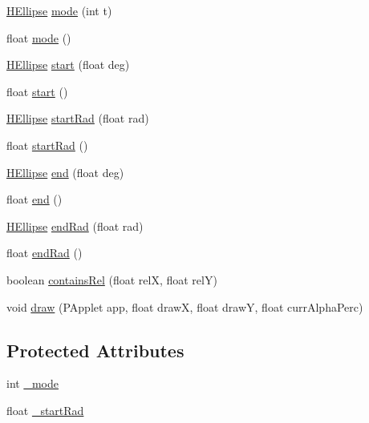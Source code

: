 \begin{DoxyCompactItemize}
\item 
\hyperlink{classhype_1_1drawable_1_1_h_ellipse}{H\-Ellipse} \hyperlink{classhype_1_1drawable_1_1_h_ellipse_a86f886d10570ddd23fbc4833dae0998f}{mode} (int t)
\item 
float \hyperlink{classhype_1_1drawable_1_1_h_ellipse_a9c05de6d5096df8a3e01211495bdb37b}{mode} ()
\item 
\hyperlink{classhype_1_1drawable_1_1_h_ellipse}{H\-Ellipse} \hyperlink{classhype_1_1drawable_1_1_h_ellipse_a4c22811a583ef8f35f2ef3ae46920791}{start} (float deg)
\item 
float \hyperlink{classhype_1_1drawable_1_1_h_ellipse_a07ea457eb86627aa14018eb5f09e6ec9}{start} ()
\item 
\hyperlink{classhype_1_1drawable_1_1_h_ellipse}{H\-Ellipse} \hyperlink{classhype_1_1drawable_1_1_h_ellipse_a6c62de3878dff1b5a57cddf6a03f2306}{start\-Rad} (float rad)
\item 
float \hyperlink{classhype_1_1drawable_1_1_h_ellipse_ab3f78c9de4b22b83339389b08127351a}{start\-Rad} ()
\item 
\hyperlink{classhype_1_1drawable_1_1_h_ellipse}{H\-Ellipse} \hyperlink{classhype_1_1drawable_1_1_h_ellipse_a512275d60e55379d4a961bd8c2cdb1a7}{end} (float deg)
\item 
float \hyperlink{classhype_1_1drawable_1_1_h_ellipse_a6ff1384aa920dcc6c15690057ae33c24}{end} ()
\item 
\hyperlink{classhype_1_1drawable_1_1_h_ellipse}{H\-Ellipse} \hyperlink{classhype_1_1drawable_1_1_h_ellipse_a5b307e00cc0df0f7a9ebe8384a150e8d}{end\-Rad} (float rad)
\item 
float \hyperlink{classhype_1_1drawable_1_1_h_ellipse_a799cccf3358521b4594da6f2371132ee}{end\-Rad} ()
\item 
boolean \hyperlink{classhype_1_1drawable_1_1_h_ellipse_ac9695d60c9229944ae52e83e16b19b97}{contains\-Rel} (float rel\-X, float rel\-Y)
\item 
void \hyperlink{classhype_1_1drawable_1_1_h_ellipse_a94aa4d65e442b481e73eb3f14275fcfd}{draw} (P\-Applet app, float draw\-X, float draw\-Y, float curr\-Alpha\-Perc)
\end{DoxyCompactItemize}
\subsection*{Protected Attributes}
\begin{DoxyCompactItemize}
\item 
int \hyperlink{classhype_1_1drawable_1_1_h_ellipse_aa135a1010364048f6c02b7a01451cc8e}{\-\_\-mode}
\item 
float \hyperlink{classhype_1_1drawable_1_1_h_ellipse_a68c2277274139f7b1866f5b49812457f}{\-\_\-start\-Rad}
\end{DoxyCompactItemize}
